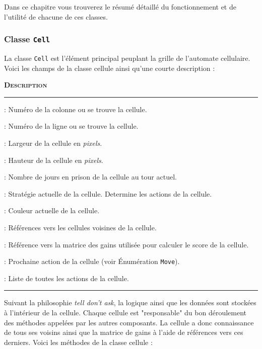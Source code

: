 \documentclass[a4paper]{article}
\begin{document}
Dans ce chapitre vous trouverez le résumé détaillé du fonctionnement et de l'utilité de chacune de ces classes.

\subsubsection{Classe \texttt{Cell}}
La classe \texttt{Cell} est l'élément principal peuplant la grille de l'automate cellulaire. Voici les champs de la classe cellule ainsi qu'une courte description :  

\vspace{0.25cm}
\begin{description}[labelwidth=2.50cm]
    \small
    \item[\textbf{\textsc{Champ}}] \textbf{\textsc{Description}}
    \vspace{0.1cm}
    \hrule{}
    \item[\texttt{x}]             :  Numéro de la colonne ou se trouve la cellule.
    \item[\texttt{y}]             :  Numéro de la ligne ou se trouve la cellule.
    \item[\texttt{width}]         :  Largeur de la cellule en \textit{pixels}.
    \item[\texttt{height}]        :  Hauteur de la cellule en \textit{pixels}.
    \item[\texttt{score}]         :  Nombre de jours en prison de la cellule au tour actuel.
    \item[\texttt{strategy}]      :  Stratégie actuelle de la cellule. Determine les actions de la cellule.
    \item[\texttt{color}]         :  Couleur actuelle de la cellule.
    \item[\texttt{neighbors}]     :  Références vers les cellules voisines de la cellule.
    \item[\texttt{payoffMatrix}]  :  Référence vers la matrice des gains utilisée pour calculer le score de la cellule.
    \item[\texttt{choice}]      :  Prochaine action de la cellule (voir Énumération \texttt{Move}).
    \item[\texttt{history}]       :  Liste de toutes les actions de la cellule.
\end{description}
\hrule{}
\vspace{0.5cm}

Suivant la philosophie \textit{tell don't ask}, la logique ainsi que les données sont stockées à l'intérieur de la cellule. Chaque cellule est "responsable" du bon déroulement des méthodes appelées par les autres composants. La cellule a donc connaissance de tous ses voisins ainsi que la matrice de gains à l'aide de références vers ces derniers. Voici les méthodes de la classe cellule : 
\end{document}
